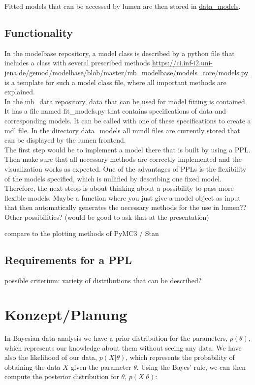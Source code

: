 \documentclass{article}
\begin{document}
 Fitted models that can be accessed by lumen are then stored in \url{data_models}.

\subsection{Functionality}

In the modelbase repository, a model class is described by a python file that includes a class with several prescribed methods \url{https://ci.inf-i2.uni-jena.de/gemod/modelbase/blob/master/mb_modelbase/models_core/models.py} is a template for such a model class file, where all important methods are explained.
\\
In the mb\_data repository, data that can be used for model fitting is contained. It has a file named fit\_models.py that contains specifications of data and corresponding models. It can be called with one of these specifications to create a mdl file. In the directory data\_models all mmdl files are currently stored that can be displayed by the lumen frontend.
\\
The first step would be to implement a model there that is built by using a PPL. Then make sure that all necessary methods are correctly implemented and the visualization works as expected. One of the advantages of PPLs is the flexibility of the models specified, which is nullified by describing one fixed model. Therefore, the next steop is about thinking about a possibility to pass more flexible models. Maybe a function where you just give a model object as input that then automatically generates the necessary methods for the use in lumen??  Other possibilities? (would be good to ask that at the presentation)




compare to the plotting methods of PyMC3 / Stan

\subsection{Requirements for a PPL}

possible criterium: variety of distributions that can be described?



\section{Konzept/Planung}

In Bayesian data analysis we have a prior distribution for the parameters, $p(\theta)$, which represents our knowledge about them without seeing any data. We have also the likelihood of our data, $p(X|\theta)$, which represents the probability of obtaining the data $X$ given the parameter $\theta$. Using the Bayes' rule, we can then compute the posterior distribution for $\theta$, $p(X|\theta)$:
\end{document}
